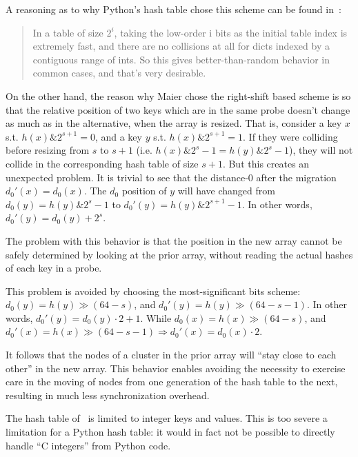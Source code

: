 A reasoning as to why Python's hash table chose this scheme can be found in~\cite{dict-comment-hash}:
\begin{quote}
	In a table of size $2^i$, taking the low-order i bits as the initial table index is extremely fast, and there
	are no collisions at all for dicts indexed by a contiguous range of ints.
	So this gives better-than-random behavior in common cases, and that's very desirable.
\end{quote}
On the other hand, the reason why Maier chose the right-shift based scheme is so that the relative position of two keys which are in the same probe doesn't change as much as in the alternative, when the array is resized.
That is, consider a key $x$ s.t. $h(x) \mathbin{\&} 2^{s + 1} = 0$, and a key $y$ s.t. $h(x) \mathbin{\&} 2^{s + 1} = 1$.
If they were colliding before resizing from $s$ to $s + 1$ (i.e. $h(x) \mathbin{\&} 2^s - 1 = h(y) \mathbin{\&} 2^s - 1$), they will not collide in the corresponding hash table of size $s + 1$.
But this creates an unexpected problem.
It is trivial to see that the distance-0 after the migration $d_0'(x) = d_0(x)$.
The $d_0$ position of $y$ will have changed from $d_0(y) = h(y) \mathbin{\&} 2^s-1$ to $d_0'(y) = h(y) \mathbin{\&} 2^{s+1}-1$.
In other words, $d_0'(y) = d_0(y) + 2^s$.

The problem with this behavior is that the position in the new array cannot be safely determined by looking at the prior array, without reading the actual hashes of each key in a probe.

This problem is avoided by choosing the most-significant bits scheme: $d_0(y) = h(y) \gg (64 - s)$, and $d_0'(y) = h(y) \gg (64 - s - 1)$.
In other words, $d_0'(y) = d_0(y) \cdot 2 + 1$.
While $d_0(x) = h(x) \gg (64 - s)$, and $d_0'(x) = h(x) \gg (64 - s - 1) \Rightarrow d_0'(x) = d_0(x) \cdot 2$.

It follows that the nodes of a cluster in the prior array will ``stay close to each other'' in the new array.
This behavior enables avoiding the necessity to exercise care in the moving of nodes from one generation of the hash table to the next, resulting in much less synchronization overhead.

The hash table of~\cite{maier} is limited to integer keys and values.
This is too severe a limitation for a Python hash table: it would in fact not be possible to directly handle ``C integers'' from Python code.


